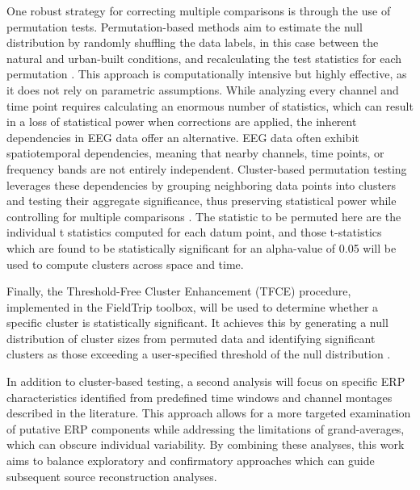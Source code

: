 One robust strategy for correcting multiple comparisons is through the use of permutation tests. Permutation-based methods aim to estimate the null distribution by randomly shuffling the data labels, in this case between the natural and urban-built conditions, and recalculating the test statistics for each permutation \cite{cohenAnalyzingNeuralTime2014, marisNonparametricStatisticalTesting2007}. This approach is computationally intensive but highly effective, as it does not rely on parametric assumptions. While analyzing every channel and time point requires calculating an enormous number of statistics, which can result in a loss of statistical power when corrections are applied, the inherent dependencies in EEG data offer an alternative. EEG data often exhibit spatiotemporal dependencies, meaning that nearby channels, time points, or frequency bands are not entirely independent. Cluster-based permutation testing leverages these dependencies by grouping neighboring data points into clusters and testing their aggregate significance, thus preserving statistical power while controlling for multiple comparisons \cite{pernetClusterbasedComputationalMethods2015a}. The statistic to be permuted here are the individual t statistics computed for each datum point, and those t-statistics which are found to be statistically significant for an alpha-value of 0.05 will be used to compute clusters across space and time.

Finally, the Threshold-Free Cluster Enhancement (TFCE) procedure, implemented in the FieldTrip toolbox, will be used to determine whether a specific cluster is statistically significant. It achieves this by generating a null distribution of cluster sizes from permuted data and identifying significant clusters as those exceeding a user-specified threshold of the null distribution \cite{pernetClusterbasedComputationalMethods2015a,oostenveldFieldTripOpenSource2011}.

In addition to cluster-based testing, a second analysis will focus on specific ERP characteristics identified from predefined time windows and channel montages described in the literature. This approach allows for a more targeted examination of putative ERP components while addressing the limitations of grand-averages, which can obscure individual variability. By combining these analyses, this work aims to balance exploratory and confirmatory approaches which can guide subsequent source reconstruction analyses.

